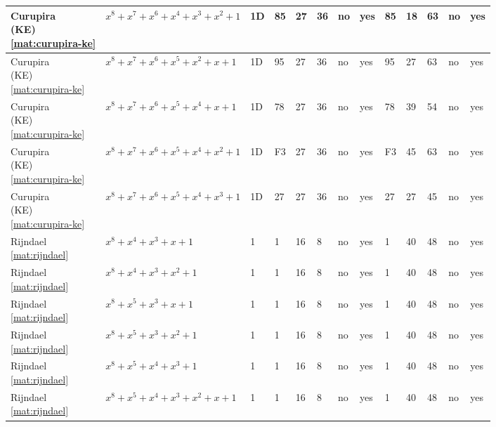 \begin{tiny}
\begin{longtable}{|l|l|l|l|l|l|l|l|l|l|l|l|l|}
\shortstack{Curupira \\ (KE) \\ \eqref{mat:curupira-ke}} & $x^8 + x^7 + x^6 + x^4 + x^3 + x^2 + 1$ & 1D & 85 & 27 & 36 & no & yes & 85 & 18 & 63 & no & yes \\ \hline
\shortstack{Curupira \\ (KE) \\ \eqref{mat:curupira-ke}} & $x^8 + x^7 + x^6 + x^5 + x^2 + x + 1$ & 1D & 95 & 27 & 36 & no & yes & 95 & 27 & 63 & no & yes \\ \hline
\shortstack{Curupira \\ (KE) \\ \eqref{mat:curupira-ke}} & $x^8 + x^7 + x^6 + x^5 + x^4 + x + 1$ & 1D & 78 & 27 & 36 & no & yes & 78 & 39 & 54 & no & yes \\ \hline
\shortstack{Curupira \\ (KE) \\ \eqref{mat:curupira-ke}} & $x^8 + x^7 + x^6 + x^5 + x^4 + x^2 + 1$ & 1D & F3 & 27 & 36 & no & yes & F3 & 45 & 63 & no & yes \\ \hline
\shortstack{Curupira \\ (KE) \\ \eqref{mat:curupira-ke}} & $x^8 + x^7 + x^6 + x^5 + x^4 + x^3 + 1$ & 1D & 27 & 27 & 36 & no & yes & 27 & 27 & 45 & no & yes \\ \hline
\shortstack{Rijndael \\ \eqref{mat:rijndael}} & $x^8 + x^4 + x^3 + x + 1$ & 1 & 1 & 16 & 8 & no & yes & 1 & 40 & 48 & no & yes \\ \hline
\shortstack{Rijndael \\ \eqref{mat:rijndael}} & $x^8 + x^4 + x^3 + x^2 + 1$ & 1 & 1 & 16 & 8 & no & yes & 1 & 40 & 48 & no & yes \\ \hline
\shortstack{Rijndael \\ \eqref{mat:rijndael}} & $x^8 + x^5 + x^3 + x + 1$ & 1 & 1 & 16 & 8 & no & yes & 1 & 40 & 48 & no & yes \\ \hline
\shortstack{Rijndael \\ \eqref{mat:rijndael}} & $x^8 + x^5 + x^3 + x^2 + 1$ & 1 & 1 & 16 & 8 & no & yes & 1 & 40 & 48 & no & yes \\ \hline
\shortstack{Rijndael \\ \eqref{mat:rijndael}} & $x^8 + x^5 + x^4 + x^3 + 1$ & 1 & 1 & 16 & 8 & no & yes & 1 & 40 & 48 & no & yes \\ \hline
\shortstack{Rijndael \\ \eqref{mat:rijndael}} & $x^8 + x^5 + x^4 + x^3 + x^2 + x + 1$ & 1 & 1 & 16 & 8 & no & yes & 1 & 40 & 48 & no & yes \\ \hline

\end{longtable}
\end{tiny}
